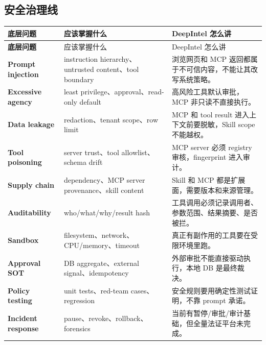 \subsection{安全治理线}
\begin{longtable}{>{\bfseries}p{}p{}p{}}
\toprule
底层问题 & 应该掌握什么 & DeepIntel 怎么讲 \\
\midrule
\endfirsthead
\toprule
底层问题 & 应该掌握什么 & DeepIntel 怎么讲 \\
\midrule
\endhead
Prompt injection & instruction hierarchy、untrusted content、tool boundary & 浏览网页和 MCP 返回都属于不可信内容，不能让其改写系统策略。 \\
Excessive agency & least privilege、approval、read-only default & 高风险工具默认审批，MCP 非只读不直接执行。 \\
Data leakage & redaction、tenant scope、row limit & MCP 和 tool result 进入上下文前要脱敏，Skill scope 不能越权。 \\
Tool poisoning & server trust、tool allowlist、schema drift & MCP server 必须 registry 审核，fingerprint 进入审计。 \\
Supply chain & dependency、MCP server provenance、skill content & Skill 和 MCP 都是扩展面，需要版本和来源管理。 \\
Auditability & who/what/why/result hash & 工具调用必须记录调用者、参数范围、结果摘要、是否被拦。 \\
Sandbox & filesystem、network、CPU/memory、timeout & 真正有副作用的工具要在受限环境里跑。 \\
Approval SOT & DB aggregate、external signal、idempotency & 外部审批不能直接驱动执行，本地 DB 是最终裁决。 \\
Policy testing & unit tests、red-team cases、regression & 安全规则要用确定性测试证明，不靠 prompt 承诺。 \\
Incident response & pause、revoke、rollback、forensics & 当前有暂停/审批/审计基础，但全量法证平台未完成。 \\
\bottomrule
\end{longtable}

